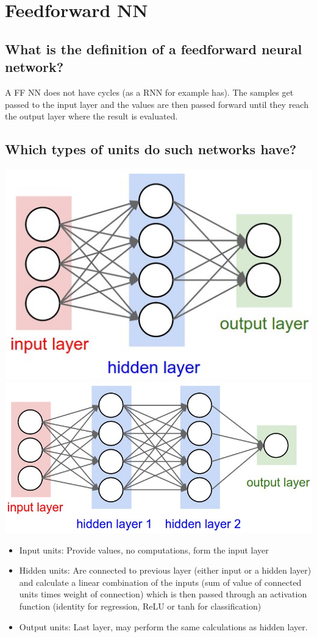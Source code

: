 \section{Feedforward NN}
\subsection{What is the definition of a feedforward neural network?}
A FF NN does not have cycles (as a RNN for example has). The samples get passed to the input layer and the values are then passed forward until they reach the output layer where the result is evaluated.
\subsection{Which types of units do such networks have?}
\begin{minipage}{0.3\textwidth}
\includegraphics[width=\textwidth]{./img/ffnn1.jpeg}
\includegraphics[width=\textwidth]{./img/ffnn2.jpeg}
\end{minipage}
\begin{minipage}{0.7\textwidth}
\begin{itemize}
\item Input units: Provide values, no computations, form the input layer
\item Hidden units: Are connected to previous layer (either input or a hidden layer) and calculate a linear combination of the inputs (sum of value of connected units times weight of connection) which is then passed through an activation function (identity for regression, ReLU or tanh for classification)
\item Output units: Last layer, may perform the same calculations as hidden layer.
\end{itemize}
\end{minipage}
%
